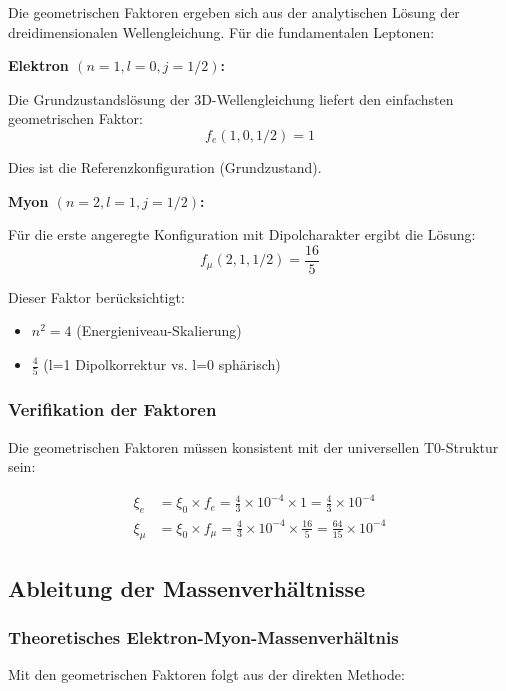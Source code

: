 \documentclass[12pt,a4paper]{article}
\begin{document}
Die geometrischen Faktoren ergeben sich aus der analytischen Lösung der dreidimensionalen Wellengleichung. Für die fundamentalen Leptonen:

\textbf{Elektron $(n=1, l=0, j=1/2)$:}

Die Grundzustandslösung der 3D-Wellengleichung liefert den einfachsten geometrischen Faktor:
\begin{equation}
	f_e(1,0,1/2) = 1
\end{equation}

Dies ist die Referenzkonfiguration (Grundzustand).

\textbf{Myon $(n=2, l=1, j=1/2)$:}

Für die erste angeregte Konfiguration mit Dipolcharakter ergibt die Lösung:
\begin{equation}
	f_\mu(2,1,1/2) = \frac{16}{5}
\end{equation}

Dieser Faktor berücksichtigt:
\begin{itemize}
	\item $n^2 = 4$ (Energieniveau-Skalierung)
	\item $\frac{4}{5}$ (l=1 Dipolkorrektur vs. l=0 sphärisch)
\end{itemize}

\subsubsection{Verifikation der Faktoren}

Die geometrischen Faktoren müssen konsistent mit der universellen T0-Struktur sein:

\begin{align}
	\xi_e &= \xi_0 \times f_e = \frac{4}{3} \times 10^{-4} \times 1 = \frac{4}{3} \times 10^{-4}\\
	\xi_\mu &= \xi_0 \times f_\mu = \frac{4}{3} \times 10^{-4} \times \frac{16}{5} = \frac{64}{15} \times 10^{-4}
\end{align}

\subsection{Ableitung der Massenverhältnisse}

\subsubsection{Theoretisches Elektron-Myon-Massenverhältnis}

Mit den geometrischen Faktoren folgt aus der direkten Methode:
\end{document}

